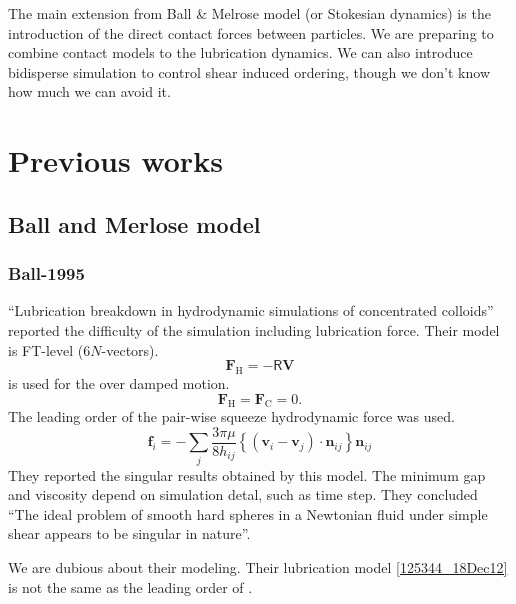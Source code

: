 \documentclass[12pt]{article}
\newcommand{\tens}[1]{\bm{\mathsf{#1}}}
\begin{document}

The main extension from Ball \& Melrose model (or Stokesian dynamics)
is the introduction of the direct contact forces between particles.
%
We are preparing to combine contact models 
to the lubrication dynamics.
%
We can also introduce bidisperse simulation
to control shear induced ordering,
though we don't know how much we can avoid it.




\section{Previous works}
\subsection*{Ball and Merlose model}

\subsubsection*{Ball-1995}

\citet{Ball_1995} ``Lubrication breakdown in hydrodynamic simulations of concentrated colloids''
reported the difficulty of the simulation including lubrication force.
Their model is FT-level ($6N$-vectors).
\begin{equation}
 \bm{F}_{\mathrm{H}} = - \tens{R} \bm{V}
\end{equation}
is used for the over damped motion.
\begin{equation}
 \bm{F}_{\mathrm{H}} = \bm{F}_{\mathrm{C}} = 0.
\end{equation}
%
The leading order of the pair-wise squeeze hydrodynamic force
was used.
\begin{equation}
 \bm{f}_i = 
- \sum_j \frac{3 \pi \mu}{8 h_{ij}} 
\left\{
(\bm{v}_i - \bm{v}_j)\cdot \bm{n}_{ij}
\right\} \bm{n}_{ij}\label{125344_18Dec12}
\end{equation}
%
They reported the singular results obtained by this model.
%
The minimum gap and viscosity 
depend on simulation detal, such as time step.
%
They concluded
``The ideal problem of smooth hard spheres
in a Newtonian fluid under simple shear appears
to be singular in nature''.
%


We are dubious about their modeling.
%
Their lubrication model \eqref{125344_18Dec12}
is not the same as the leading order of \citet{Jeffrey_1992}.
\end{document}

